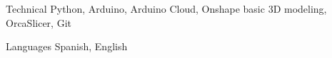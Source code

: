 
\begin{cvskills}

  \cvskill
  {Technical} %
  {Python, Arduino, Arduino Cloud, Onshape basic 3D modeling, OrcaSlicer, Git} %

  \cvskill
  {Languages} %
  {Spanish, English} %


\end{cvskills}
